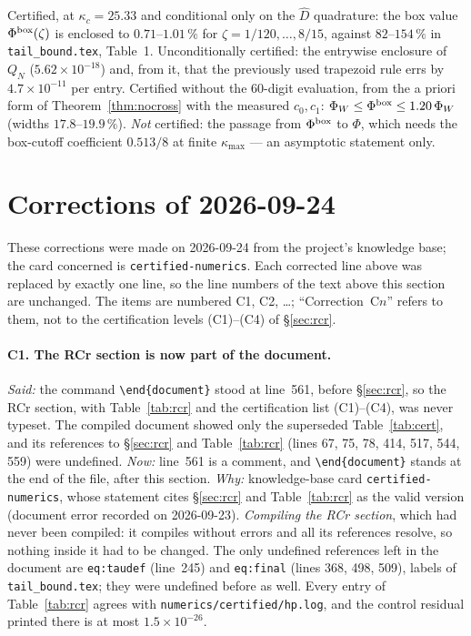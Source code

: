 \documentclass[11pt]{article}
\begin{document}
\begin{verdictok}
Certified, at $\kappa_c=25.33$ and conditional only on the $\widehat D$ quadrature: the box value
$\Phi^{\rm box}(\zeta)$ is enclosed to $0.71$--$1.01\,\%$ for $\zeta=1/120,\dots,8/15$, against
$82$--$154\,\%$ in \texttt{tail\_bound.tex}, Table~1.  Unconditionally certified: the entrywise
enclosure of $Q_N$ ($5.62\times10^{-18}$) and, from it, that the previously used trapezoid rule errs
by $4.7\times10^{-11}$ per entry.  Certified without the $60$-digit evaluation, from the a priori
form of Theorem~\ref{thm:nocross} with the measured $c_0,c_1$: $\Phi_W\le\Phi^{\rm box}\le
1.20\,\Phi_W$ (widths $17.8$--$19.9\,\%$).  \emph{Not} certified: the passage from $\Phi^{\rm box}$
to $\Phi$, which needs the box-cutoff coefficient $0.513/8$ at finite $\kappa_{\max}$ --- an
asymptotic statement only.
\end{verdictok}

\section{Corrections of 2026-09-24}\label{corr0924:sec}

These corrections were made on 2026-09-24 from the project's knowledge base; the card concerned
is \texttt{certified-numerics}.  Each corrected line above was replaced by exactly one line, so the
line numbers of the text above this section are unchanged.  The items are numbered C1, C2,
\dots; ``Correction~C$n$'' refers to them, not to the certification levels (C1)--(C4) of
\S\ref{sec:rcr}.

\paragraph{C1. The RCr section is now part of the document.}  \emph{Said:} the command
\texttt{\textbackslash end\{document\}} stood at line~561, before \S\ref{sec:rcr}, so the RCr
section, with Table~\ref{tab:rcr} and the certification list (C1)--(C4), was never typeset.  The
compiled document showed only the superseded Table~\ref{tab:cert}, and its references to
\S\ref{sec:rcr} and Table~\ref{tab:rcr} (lines 67, 75, 78, 414, 517, 544, 559) were undefined.
\emph{Now:} line~561 is a comment, and \texttt{\textbackslash end\{document\}} stands at the end of
the file, after this section.  \emph{Why:} knowledge-base card \texttt{certified-numerics}, whose
statement cites \S\ref{sec:rcr} and Table~\ref{tab:rcr} as the valid version (document error
recorded on 2026-09-23).  \emph{Compiling the RCr section}, which had never been compiled: it
compiles without errors and all its references resolve, so nothing inside it had to be changed.
The only undefined references left in the document are \texttt{eq:taudef} (line~245) and
\texttt{eq:final} (lines 368, 498, 509), labels of \texttt{tail\_bound.tex}; they were undefined
before as well.  Every entry of Table~\ref{tab:rcr} agrees with
\texttt{numerics/certified/hp.log}, and the control residual printed there is at most
$1.5\times10^{-26}$.
\end{document}

